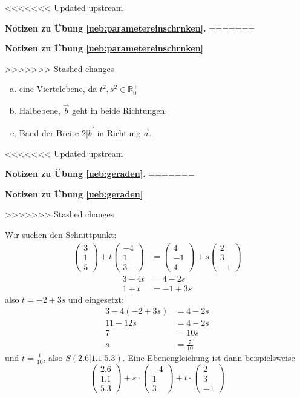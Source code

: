 \documentclass[%
11pt,%
twoside,%
titlepage,%
<<<<<<< Updated upstream
german,%
=======
swissgerman,%
>>>>>>> Stashed changes
headsepline%
]{scrartcl}
\newcommand{\faReturnGray}{\textcolor{gray}{\faMailReply}} %
\theoremstyle{definition}
\theoremstyle{plain}
\newcommand{\concatueb}[1]{ueb:#1}%
\newcommand{\concatlsg}[1]{lsg:#1}%
\newenvironment{lsg}[1]{%
<<<<<<< Updated upstream
    \par\noindent\textbf{Notizen zu Übung \ref{\concatueb{#1}}.}%
    \label{\concatlsg{#1}}
=======
    \par\noindent\textbf{Notizen zu Übung \ref{\concatueb{#1}}}\label{\concatlsg{#1}}
    \hfill\hyperref[\concatueb{#1}]{\faReturnGray}\par %
>>>>>>> Stashed changes
}{%
    \par%
}
\begin{document}
\begin{lsg}{parametereinschrnken}
\begin{enumerate}[a)]
    \item eine Viertelebene, da $t^2,s^2\in\mathbb{R}_0^+$
    \item Halbebene, $\vec{b}$ geht in beide Richtungen.
    \item Band der Breite $2|\vec{b|}$ in Richtung $\vec{a}$.
\end{enumerate}
\end{lsg}
\begin{lsg}{geraden}
Wir suchen den Schnittpunkt:
\begin{align*}
    \begin{pmatrix}3\\1\\5\end{pmatrix}+t\begin{pmatrix}-4\\1\\3\end{pmatrix} &= \begin{pmatrix}4\\-1\\4\end{pmatrix}+s\begin{pmatrix}2\\3\\-1\end{pmatrix}
\end{align*}
\begin{align*}
    3-4t &= 4-2s\\
    1+t &= -1+3s
\end{align*}
also $t=-2+3s$ und eingesetzt:
\begin{align*}
    3-4(-2+3s) &= 4-2s\\
    11-12s &= 4-2s\\
    7 &= 10s\\
    s &= \frac{7}{10}
\end{align*}
und $t=\frac{1}{10}$, also $S(2.6|1.1|5.3)$. Eine Ebenengleichung ist dann beispielsweise
$$\begin{pmatrix}
    2.6\\1.1\\5.3
\end{pmatrix}+s\cdot\begin{pmatrix}
    -4\\1\\3
\end{pmatrix}+t\cdot\begin{pmatrix}
    2\\3\\-1
\end{pmatrix}$$
\end{lsg}
\end{document}
